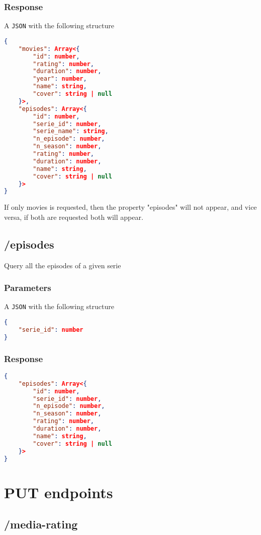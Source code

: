 \documentclass{article}
\newcommand{\mono}{\texttt}
\begin{document}
\subsubsection{Response}
A \mono{JSON} with the following structure

\begin{lstlisting}[language=json]
{
	"movies": Array<{
		"id": number,
		"rating": number,
		"duration": number,
		"year": number,
		"name": string,
		"cover": string | null
	}>,
	"episodes": Array<{
		"id": number,
		"serie_id": number,
		"serie_name": string,
		"n_episode": number,
		"n_season": number,
		"rating": number,
		"duration": number,
		"name": string,
		"cover": string | null
	}>
}
\end{lstlisting}

If only movies is requested, then the property "episodes" will not appear, and vice versa, if both are requested both will appear.

\subsection{/episodes}

Query all the episodes of a given serie

\subsubsection{Parameters}
A \mono{JSON} with the following structure

\begin{lstlisting}[language=json]
{
	"serie_id": number
}
\end{lstlisting}

\subsubsection{Response}

\begin{lstlisting}[language=json]
{
	"episodes": Array<{
		"id": number,
		"serie_id": number,
		"n_episode": number,
		"n_season": number,
		"rating": number,
		"duration": number,
		"name": string,
		"cover": string | null
	}>
}
\end{lstlisting}

\section{PUT endpoints}

\subsection{/media-rating}
\end{document}
